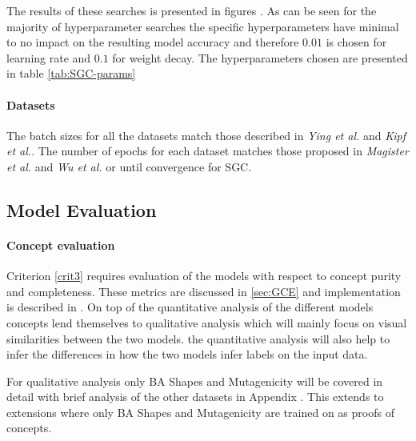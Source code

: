The results of these searches is presented in figures .
As can be seen for the majority of hyperparameter searches the specific hyperparameters have minimal to no impact on the resulting model accuracy and therefore $0.01$ is chosen for learning rate and $0.1$ for weight decay.
The hyperparameters chosen are presented in table \ref{tab:SGC-params}



\paragraph{Datasets}
The batch sizes for all the datasets match those described in \textit{Ying et al.}\cite{ying2019gnnexplainer} and \textit{Kipf et al.}\cite{kipf2016semi}.
The number of epochs for each dataset matches those proposed in \textit{Magister et al.}\cite{magister2021gcexplainer} and \textit{Wu et al.}\cite{wu2019simplifying} or until convergence for SGC.

\subsection{Model Evaluation}
\label{sec:evaluation}

\paragraph{Concept evaluation}
Criterion \ref{crit3} requires evaluation of the models with respect to concept purity and completeness.
These metrics are discussed in \ref{sec:GCE} and implementation is described in .
On top of the quantitative analysis of the different models concepts lend themselves to qualitative analysis which will mainly focus on visual similarities between the two models.
the quantitative analysis will also help to infer the differences in how the two models infer labels on the input data.

For qualitative analysis only BA Shapes and Mutagenicity will be covered in detail with brief analysis of the other datasets in Appendix .
This extends to extensions where only BA Shapes and Mutagenicity are trained on as proofs of concepts.

